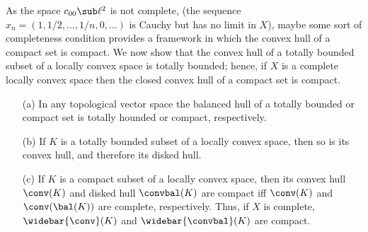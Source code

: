 As the space $c_{00}\sub\ell^2$ is not complete, (the sequence $x_n=(1,1/2,\dots,1/n,0,\dots)$ is Cauchy but has no limit in $X$), maybe some sort of completeness condition provides a framework in which the convex hull of a compact set is compact. We now show that the convex hull of a totally bounded subset of a locally convex space is totally bounded; hence, if $X$ is a complete locally convex space then the closed convex hull of a compact set is compact.
\begin{theorem}\label{TVS hull of totally bounded or compact sets}
\mbox{}
\begin{itemize}
\item[(a)] In any topological vector space the balanced hull of a totally bounded or compact set is totally hounded or compact, respectively.
\item[(b)] If $K$ is a totally bounded subset of a locally convex space, then so is its convex hull, and therefore its disked hull.
\item[(c)] If $K$ is a compact subset of a locally convex space, then its convex hull $\conv(K)$ and disked hull $\convbal(K)$ are compact iff $\conv(K)$ and $\conv(\bal(K))$ are complete, respectively. Thus, if $X$ is complete, $\widebar{\conv}(K)$ and $\widebar{\convbal}(K)$ are compact.
\end{itemize}
\end{theorem}

